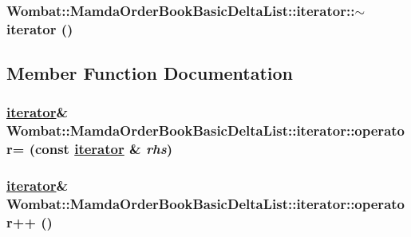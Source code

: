 \hypertarget{classWombat_1_1MamdaOrderBookBasicDeltaList_1_1iterator_977160e063f28b4ebf01ad083fe9b483}{
\subsubsection[$\sim$iterator]{\setlength{\rightskip}{0pt plus 5cm}Wombat::Mamda\-Order\-Book\-Basic\-Delta\-List::iterator::$\sim$iterator ()}}
\label{classWombat_1_1MamdaOrderBookBasicDeltaList_1_1iterator_977160e063f28b4ebf01ad083fe9b483}




\subsection{Member Function Documentation}
\hypertarget{classWombat_1_1MamdaOrderBookBasicDeltaList_1_1iterator_3311d1e01265f02affd0aae547619d26}{
\subsubsection[operator=]{\setlength{\rightskip}{0pt plus 5cm}\hyperlink{classWombat_1_1MamdaOrderBookBasicDeltaList_1_1iterator}{iterator}\& Wombat::Mamda\-Order\-Book\-Basic\-Delta\-List::iterator::operator= (const \hyperlink{classWombat_1_1MamdaOrderBookBasicDeltaList_1_1iterator}{iterator} \& {\em rhs})}}
\label{classWombat_1_1MamdaOrderBookBasicDeltaList_1_1iterator_3311d1e01265f02affd0aae547619d26}


\hypertarget{classWombat_1_1MamdaOrderBookBasicDeltaList_1_1iterator_5dee1005097b25c4243403590ebcee0a}{
\subsubsection[operator++]{\setlength{\rightskip}{0pt plus 5cm}\hyperlink{classWombat_1_1MamdaOrderBookBasicDeltaList_1_1iterator}{iterator}\& Wombat::Mamda\-Order\-Book\-Basic\-Delta\-List::iterator::operator++ ()}}
\label{classWombat_1_1MamdaOrderBookBasicDeltaList_1_1iterator_5dee1005097b25c4243403590ebcee0a}


